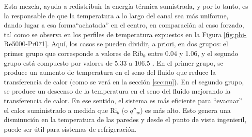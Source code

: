 \begin{figure}[H]
  \centering
  \caption{}
\end{figure}

Esta mezcla, ayuda a redistribuir la energía térmica sumistrada, y por lo tanto, es la responsable de que la temperatura a lo largo del canal sea más uniforme, dando lugar a esa forma``achatada'' en el centro, en comparación al caso forzado, tal como se observa en los perfiles de temperatura expuestos en la Figura \ref{fig:phi-Re5000-Pr071}. Aquí, los casos se pueden dividir, a priori, en dos grupos: el primer grupo que corresponde a valores de Rib$_b$ entre 0.04 y 1.06, y el segundo grupo está compuesto por valores de 5.33 a 106.5 . En el primer grupo, se produce un aumento de temperatura en el seno del fluido que reduce la transferencia de calor (como se verá en la sección \ref{sec:nu}). En el segundo grupo, se produce un descenso de la temperatura en el seno del fluido mejorando la transferencia de calor. En ese sentido, el sistema es más eficiente para ``evacuar'' el calor suministrado a medida que Ri$_b$ (o $q''_w$) es más alto. Esto genera una disminución en la temperatura de las paredes y desde el punto de vista ingenieríl, puede ser útil para sistemas de refrigeración. 

